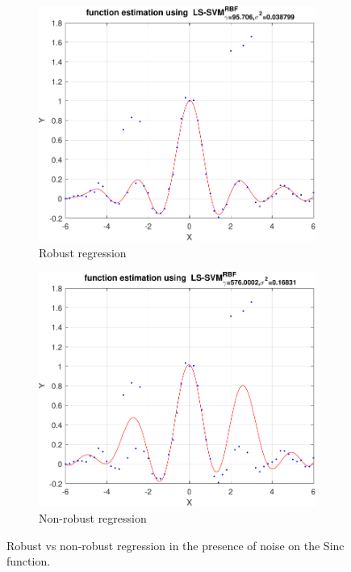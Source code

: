 \documentclass{article}
\begin{document}
        
        \begin{figure}[h]
             \centering
             \hspace{0.05\textwidth}
             \begin{subfigure}[b]{0.4\textwidth}
                 \centering
                 \includegraphics[width=\textwidth]{Assignment 2/figures/1_4/robust_mae_whuber.pdf}
                 \caption{Robust regression}
                 \label{fig:robust_regression}
             \end{subfigure}
             \hfill
             \begin{subfigure}[b]{0.4\textwidth}
                 \centering
                 \includegraphics[width=\textwidth]{Assignment 2/figures/1_4/standard_mse.pdf}
                 \caption{Non-robust regression}
                 \label{fig:non_robust_regression}
             \end{subfigure}
             \hspace{0.05\textwidth}
            \caption{Robust vs non-robust regression in the presence of noise on the Sinc function. }
        \end{figure}
\end{document}

